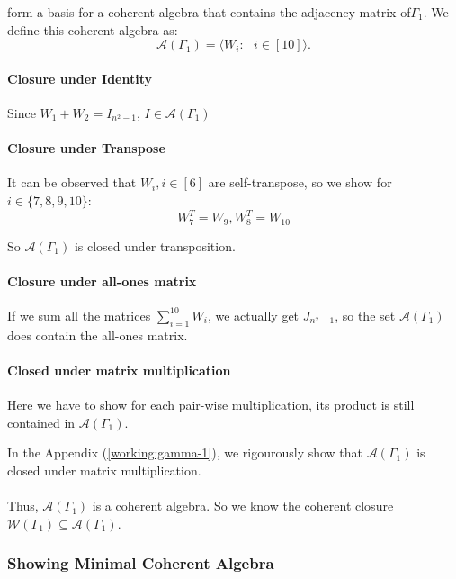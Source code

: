 form a basis for a coherent algebra that contains the adjacency matrix of$\Gamma_1$. We define this coherent algebra as:
\begin{equation*}
    \mathcal{A}(\Gamma_1) = \langle W_i: \text{ }i\in[10]\rangle.
\end{equation*}

\paragraph{Closure under Identity}
Since $W_1+W_2 = I_{n^2-1}$, $I\in\mathcal{A}(\Gamma_1)$

\paragraph{Closure under Transpose}
It can be observed that $W_i, i\in[6]$ are self-transpose, so we show for $i\in\{7,8,9,10\}$:
\begin{equation*}
    W_7^T = W_9, W_8^T=W_{10}
\end{equation*}

So $\mathcal{A}(\Gamma_1)$ is closed under transposition.

\paragraph{Closure under all-ones matrix}
If we sum all the matrices $\sum_{i=1}^{10}W_i$, we actually get $J_{n^2-1}$, so the set $\mathcal{A}(\Gamma_1)$ does contain the all-ones matrix.

\paragraph{Closed under matrix multiplication}

Here we have to show for each pair-wise multiplication, its product is still contained in $\mathcal{A}(\Gamma_1)$. 

In the Appendix (\ref{working:gamma-1}), we rigourously show that $\mathcal{A}(\Gamma_1)$ is closed under matrix multiplication.

\paragraph{}
Thus, $\mathcal{A}(\Gamma_1)$ is a coherent algebra. So we know the coherent closure $\mathcal{W}(\Gamma_1)\subseteq\mathcal{A}(\Gamma_1)$.

\subsubsection{Showing Minimal Coherent Algebra}

